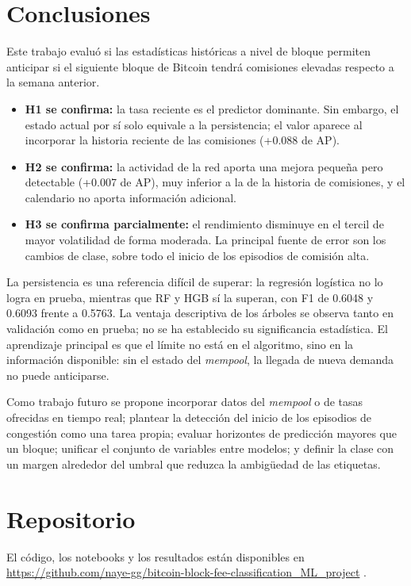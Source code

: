 \documentclass[conference]{IEEEtran}
\begin{document}
\section{Conclusiones}
Este trabajo evaluó si las estadísticas históricas a nivel de bloque permiten anticipar si el siguiente bloque de Bitcoin tendrá comisiones elevadas respecto a la semana anterior.

\begin{itemize}
\item \textbf{H1 se confirma:} la tasa reciente es el predictor dominante. Sin embargo, el estado actual por sí solo equivale a la persistencia; el valor aparece al incorporar la historia reciente de las comisiones (+0.088 de AP).
\item \textbf{H2 se confirma:} la actividad de la red aporta una mejora pequeña pero detectable (+0.007 de AP), muy inferior a la de la historia de comisiones, y el calendario no aporta información adicional.
\item \textbf{H3 se confirma parcialmente:} el rendimiento disminuye en el tercil de mayor volatilidad de forma moderada. La principal fuente de error son los cambios de clase, sobre todo el inicio de los episodios de comisión alta.
\end{itemize}

La persistencia es una referencia difícil de superar: la regresión logística no lo logra en prueba, mientras que RF y HGB sí la superan, con F1 de 0.6048 y 0.6093 frente a 0.5763. La ventaja descriptiva de los árboles se observa tanto en validación como en prueba; no se ha establecido su significancia estadística. El aprendizaje principal es que el límite no está en el algoritmo, sino en la información disponible: sin el estado del \textit{mempool}, la llegada de nueva demanda no puede anticiparse.

Como trabajo futuro se propone incorporar datos del \textit{mempool} o de tasas ofrecidas en tiempo real; plantear la detección del inicio de los episodios de congestión como una tarea propia; evaluar horizontes de predicción mayores que un bloque; unificar el conjunto de variables entre modelos; y definir la clase con un margen alrededor del umbral que reduzca la ambigüedad de las etiquetas.

\section*{Repositorio}
El código, los notebooks y los resultados están disponibles en \url{https://github.com/naye-gg/bitcoin-block-fee-classification_ML_project} \cite{repo}.
\end{document}
